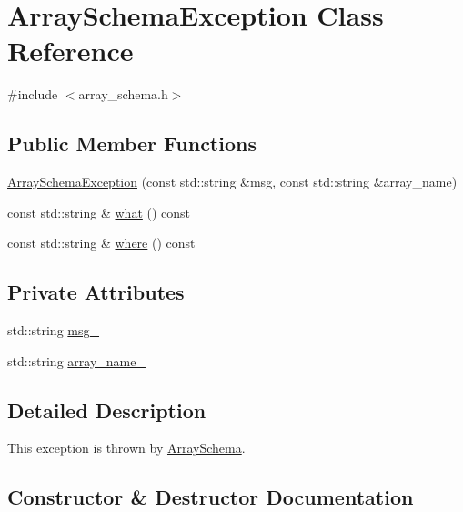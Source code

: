 \hypertarget{classArraySchemaException}{}\section{Array\+Schema\+Exception Class Reference}
\label{classArraySchemaException}


{\ttfamily \#include $<$array\+\_\+schema.\+h$>$}

\subsection*{Public Member Functions}
\begin{DoxyCompactItemize}
\item 
\hyperlink{classArraySchemaException_a9a8a7c4f3491a2dbb13f664be9ebb5bf}{Array\+Schema\+Exception} (const std\+::string \&msg, const std\+::string \&array\+\_\+name)
\item 
const std\+::string \& \hyperlink{classArraySchemaException_a2065a419260c37c1c1aa810f12f80902}{what} () const 
\item 
const std\+::string \& \hyperlink{classArraySchemaException_a48b0b4120be1813d9dbd0a0e1335c00a}{where} () const 
\end{DoxyCompactItemize}
\subsection*{Private Attributes}
\begin{DoxyCompactItemize}
\item 
std\+::string \hyperlink{classArraySchemaException_a1be9cd8521cef03552f7bd8cb66dbf32}{msg\+\_\+}
\item 
std\+::string \hyperlink{classArraySchemaException_a1fe09f0a936f026ebc1e1cceac8e116a}{array\+\_\+name\+\_\+}
\end{DoxyCompactItemize}


\subsection{Detailed Description}
This exception is thrown by \hyperlink{classArraySchema}{Array\+Schema}. 

\subsection{Constructor \& Destructor Documentation}
\hypertarget{classArraySchemaException_a9a8a7c4f3491a2dbb13f664be9ebb5bf}{}
